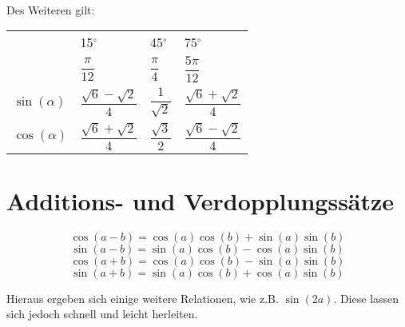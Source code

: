 \documentclass[../MAIN/main.tex]{subfiles}
\begin{document}
\\
Des Weiteren gilt:\\
\begin{center}
  \begin{tabu} to 0.9\textwidth{| X[c] | X[c] | X[c] | X[c] |}
    \hline
    & 15$^\circ$ & 45$^\circ$ & 75$^\circ$\\
    & $\dfrac{\pi}{12}$ & $\dfrac{\pi}{4}$ & $\dfrac{5\pi}{12}$\\
    \hline
    $\sin(\alpha)$ & $\dfrac{\sqrt{6}-\sqrt{2}}{4}$ & $\dfrac{1}{\sqrt{2}}$ & $\dfrac{\sqrt{6}+\sqrt{2}}{4}$\\
    \hline
    $\cos(\alpha)$ & $\dfrac{\sqrt{6}+\sqrt{2}}{4}$ & $\dfrac{\sqrt{3}}{2}$ & $\dfrac{\sqrt{6}-\sqrt{2}}{4}$\\
    \hline
  \end{tabu}
\end{center}

\section{Additions- und Verdopplungssätze}
\begin{Theorem}
    $$\cos(a - b)  = \cos(a)\cos(b) + \sin(a)\sin(b)$$
    $$\sin(a - b)  = \sin(a)\cos(b) - \cos(a)\sin(b)$$
    $$\cos(a + b)  = \cos(a)\cos(b) - \sin(a)\sin(b)$$
    $$\sin(a + b)  = \sin(a)\cos(b) + \cos(a)\sin(b)$$
\end{Theorem}
\begin{Bemerkung}
  Hieraus ergeben sich einige weitere Relationen, wie z.B. $\sin(2a)$. Diese lassen sich jedoch schnell und leicht herleiten.
\end{Bemerkung}
\end{document}

